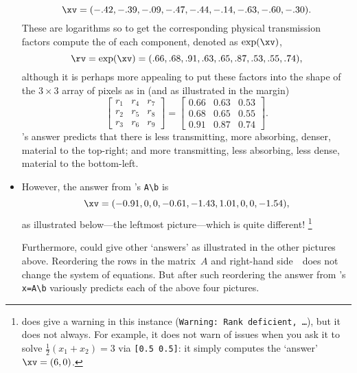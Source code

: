\begin{example}
\begin{itemize}
\begin{equation*}
\xv=
(-.42,-.39,-.09,-.47,-.44,-.14,-.63,-.60,-.30).
\end{equation*}
These are logarithms so to get the corresponding physical transmission factors compute the  of each component, denoted as \(\exp(\xv)\),
\begin{equation*}
\rv=\exp(\xv)=(.66,.68,.91,.63,.65,.87,.53,.55,.74),
\end{equation*}
although it is perhaps more appealing to put these factors into the shape of the \(3\times3\) array of pixels as in (and as illustrated in the margin)
%
\begin{equation*}
\begin{bmatrix} r_1&r_4&r_7\\r_2&r_5&r_8\\r_3&r_6&r_9 \end{bmatrix}
=\begin{bmatrix} 0.66&0.63&0.53
\\0.68&0.65&0.55
\\0.91&0.87&0.74
 \end{bmatrix}.
\end{equation*}
\script[2]'s answer predicts that there is less transmitting, more absorbing, denser, material to the top-right; and more transmitting, less absorbing, less dense, material to the bottom-left.

\item 
However, the answer from \script[1]'s \verb|A\b| is \twodp
\begin{equation*}
\xv=\small(-0.91,0,0,-0.61,-1.43,1.01,0,0,-1.54),
\end{equation*}
as illustrated below---the leftmost picture---which is quite different!%
\footnote{\script[1] does give a warning in this instance (\texttt{Warning: Rank deficient, \ldots}), but it does not always. 
For example, it does not warn of issues when you ask it to solve \(\frac12(x_1+x_2)=3\) via \texttt{[0.5 0.5]}: it simply computes the `answer' \(\xv=(6,0)\).}
\begin{center}
\hfil
{}
\hfil
{}
\hfil
{}
\end{center}
Furthermore, \script[1] could give other `answers' as illustrated in the other pictures above. 
Reordering the rows in the matrix~\(A\) and right-hand side~\bv\  does not change the system of equations.
But after such reordering the answer from \script[1]'s \verb|x=A\b|  variously predicts each of the above four pictures.
\end{itemize}



\end{example}
